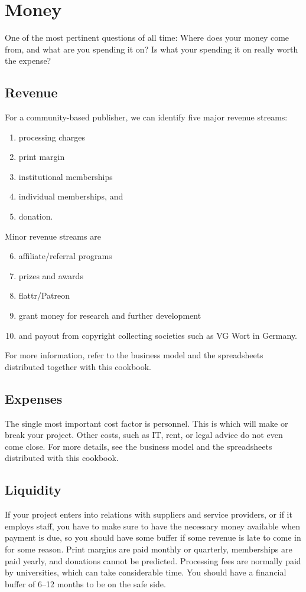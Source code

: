 \documentclass[nonflat,modfonts,output=book] {langsci/langscibook}
\begin{document}
\section{Money}\label{sec:money}
One of the most pertinent questions of all time: Where does your money come from, and what are you spending it on? Is what your spending it on really worth the expense? 
\subsection{Revenue}
For a community-based publisher, we can identify five major revenue streams: 
\begin{enumerate}
 \item processing charges
 \item print margin
 \item institutional memberships
 \item individual memberships, and  
 \item donation.
\end{enumerate}

\noindent 
Minor revenue streams are 
\begin{enumerate}
\setcounter{enumi}{5}
 \item affiliate/referral programs
 \item prizes and awards
 \item flattr/Patreon
 \item  grant money for research and further development
 \item and payout from copyright collecting societies such as VG Wort in Germany. 
\end{enumerate}
 
For more information, refer to the business model and the spreadsheets distributed together with this cookbook. 

\subsection{Expenses}
The single most important cost factor is personnel.  This is which will make or break your project. Other costs, such as IT, rent, or legal advice do not even come close. For more details, see the business model and the spreadsheets distributed with this cookbook. 

\subsection{Liquidity}
If your project enters into relations with suppliers and service providers, or if it employs staff, you have to make sure to have the necessary money available when payment is due, so you should have some buffer if some revenue is late to come in for some reason. Print margins are paid monthly or quarterly, memberships are paid yearly, and donations cannot be predicted. Processing fees are normally paid by universities, which can take considerable time. You should have a financial buffer of 6--12 months to be on the safe side. 
\end{document}
